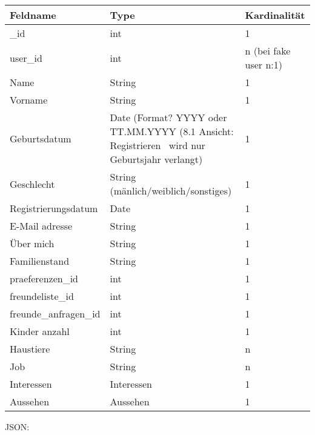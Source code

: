 \documentclass{article}
\begin{document}
\begin{flushleft}
\tablefirsthead{}
\tablehead{}
\tabletail{}
\tablelasttail{}
\begin{supertabular}{|m{5.466cm}|m{5.467cm}|m{3.76cm}|}
\hline
Feldname &
Type &
Kardinalität\\\hline
\_id &
int &
1\\\hline
user\_id &
int &
n (bei fake user n:1)\\\hline
Name  &
String &
1\\\hline
Vorname &
String &
1\\\hline
Geburtsdatum &
Date (Format? YYYY oder TT.MM.YYYY (8.1 Ansicht: Registrieren \ wird nur Geburtsjahr verlangt) &
1\\\hline
Geschlecht  &
String (mänlich/weiblich/sonstiges) &
1\\\hline
Registrierungsdatum &
Date &
1\\\hline
E-Mail adresse &
String &
1\\\hline
Über mich &
String &
1\\\hline
Familienstand  &
String &
1\\\hline
praeferenzen\_id &
int &
1\\\hline
freundeliste\_id &
int &
1\\\hline
freunde\_anfragen\_id &
int &
1\\\hline
\color{zubesprechen}
Kinder anzahl &
int &
1\\\hline
Haustiere &
String &
n\\\hline
Job &
String &
n\\\hline
Interessen  &
Interessen  &
1\\\hline
Aussehen &
Aussehen &
1 \color{black}\\\hline
\end{supertabular}
\end{flushleft}

\newpage
JSON:
\end{document}
